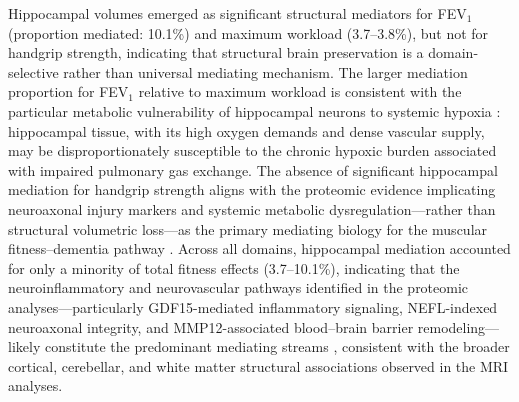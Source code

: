 \documentclass{article}
\begin{document}
Hippocampal volumes emerged as significant structural mediators for FEV$_1$ 
(proportion mediated: 10.1\%) and maximum workload (3.7--3.8\%), 
but not for handgrip strength, indicating that structural brain preservation 
is a domain-selective rather than universal mediating mechanism.
The larger mediation proportion for FEV$_1$ relative to maximum workload is 
consistent with the particular metabolic vulnerability of hippocampal 
neurons to systemic hypoxia \citep{yang2017saic, 
peers2007hypoxia}: hippocampal tissue, with its high oxygen demands and 
dense vascular supply, may be disproportionately susceptible to the 
chronic hypoxic burden associated with impaired pulmonary gas exchange.
The absence of significant hippocampal mediation for handgrip strength aligns 
with the proteomic evidence implicating neuroaxonal injury markers and 
systemic metabolic dysregulation—rather than structural volumetric 
loss—as the primary mediating biology for the muscular fitness--dementia 
pathway \citep{camandola2017brain}.
Across all domains, hippocampal mediation accounted for only a minority 
of total fitness effects (3.7--10.1\%), indicating that the 
neuroinflammatory and neurovascular pathways identified in the proteomic 
analyses—particularly GDF15-mediated inflammatory signaling, 
NEFL-indexed neuroaxonal integrity, and MMP12-associated blood--brain 
barrier remodeling—likely constitute the predominant mediating streams 
\citep{iadecola2019vascular, banks2018bbb}, consistent with the broader 
cortical, cerebellar, and white matter structural associations observed 
in the MRI analyses.
\end{document}

